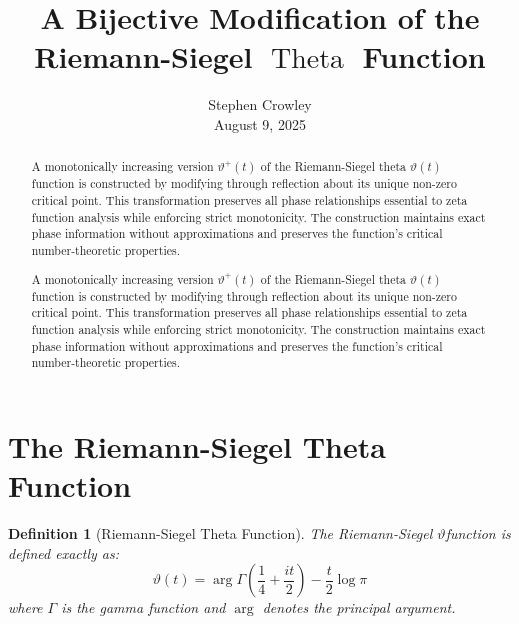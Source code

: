 \documentclass{article}
\newcommand{\tmaffiliation}[1]{\\ #1}
\newcommand{\tmop}[1]{\ensuremath{\operatorname{#1}}}
\newtheorem{definition}{Definition}
\begin{document}
\title{A Bijective Modification of the Riemann-Siegel $\tmop{Theta}$ Function}

\author{
  Stephen Crowley
  \tmaffiliation{August 9, 2025}
}

\maketitle

\begin{abstract}
  A monotonically increasing version $\vartheta^+ (t)$ of the Riemann-Siegel
  theta $\vartheta  (t)$ function is constructed by modifying through
  reflection about its unique non-zero critical point. This transformation
  preserves all phase relationships essential to zeta function analysis while
  enforcing strict monotonicity. The construction maintains exact phase
  information without approximations and preserves the function's critical
  number-theoretic properties.
\end{abstract}

{\tableofcontents}

\begin{abstract}
  A monotonically increasing version $\vartheta^+ (t)$ of the Riemann-Siegel
  theta $\vartheta (t)$ function is constructed by modifying through
  reflection about its unique non-zero critical point. This transformation
  preserves all phase relationships essential to zeta function analysis while
  enforcing strict monotonicity. The construction maintains exact phase
  information without approximations and preserves the function's critical
  number-theoretic properties.
\end{abstract}

{\tableofcontents}

\section{The Riemann-Siegel Theta Function}

\begin{definition}[Riemann-Siegel Theta Function]
  The Riemann-Siegel $\vartheta$function is defined exactly as:
  \begin{equation}
    \vartheta (t) = \arg \Gamma \left( \frac{1}{4} + \frac{it}{2} \right) -
    \frac{t}{2} \log \pi
  \end{equation}
  where $\Gamma$ is the gamma function and $\arg$ denotes the principal
  argument.
\end{definition}
\end{document}
